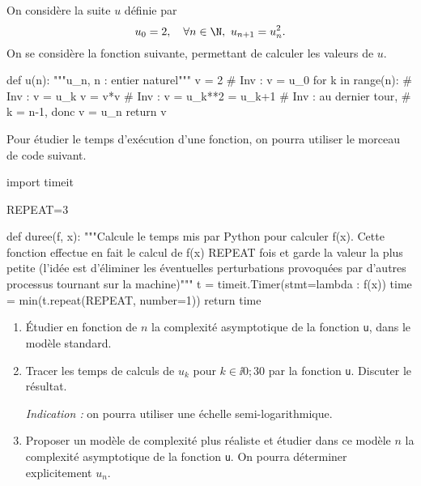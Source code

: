 On considère la suite $u$ définie par 
\begin{equation*}
  u_0 = 2,\quad \forall n \in \N,~ u_{n+1} = u_n^2.
\end{equation*}
On se considère la fonction suivante, permettant de calculer les valeurs de $u$. 
\begin{pyverbatim}
def u(n):
    """u_n, n : entier naturel"""
    v = 2
    # Inv : v = u_0
    for k in range(n):
        # Inv : v = u_k
        v = v*v
        # Inv : v = u_k**2 = u_k+1
    # Inv : au dernier tour, 
    # k = n-1, donc v = u_n
    return v
\end{pyverbatim}

Pour étudier le temps d'exécution d'une fonction, on pourra utiliser le morceau de code suivant. 
\begin{pyverbatim}
import timeit

REPEAT=3

def duree(f, x):
  """Calcule le temps mis par Python pour 
  calculer f(x).   Cette fonction effectue 
  en fait le calcul de f(x) REPEAT fois et
  garde la valeur la plus petite (l'idée est
  d'éliminer les éventuelles perturbations 
  provoquées par d'autres processus
  tournant sur la machine)"""
  t = timeit.Timer(stmt=lambda : f(x))
  time = min(t.repeat(REPEAT, number=1))
  return time
\end{pyverbatim}

\begin{enumerate}
  \item Étudier en fonction de $n$ la complexité asymptotique de la fonction \texttt{u}, dans le modèle standard.
  \item Tracer les temps de calculs de $u_k$ pour $k \in \ii{0;30}$ par la fonction \texttt{u}. Discuter le résultat.
  
    \emph{Indication :} on pourra utiliser une échelle semi-logarithmique.
  \item Proposer un modèle de complexité plus réaliste et étudier dans ce modèle $n$ la complexité asymptotique de la fonction \texttt{u}.
    On pourra déterminer explicitement $u_n$. 
\end{enumerate}
